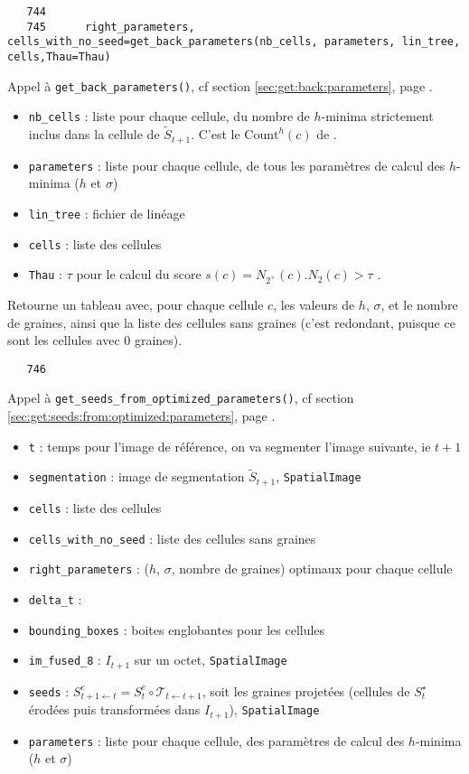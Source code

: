 \documentclass{article}
\def \mycolor {red}
\begin{document}
\color{black}
\begin{verbatim}  
   744	  
   745	    right_parameters, cells_with_no_seed=get_back_parameters(nb_cells, parameters, lin_tree, cells,Thau=Thau)
\end{verbatim} 
\color{\mycolor}
Appel \`a \texttt{get\_back\_parameters()}, cf section \ref{sec:get:back:parameters}, page \pageref{sec:get:back:parameters}.
\begin{itemize}
\itemsep -0.5ex
\item \verb|nb_cells| : liste pour chaque cellule, du nombre de $h$-minima strictement inclus dans la cellule de  $\tilde{S}_{t+1}$. C'est le $\mathrm{Count}^{h}(c)$ de \cite[section 2.3.3.5, page 71]{guignard:tel-01278725}.
\item \verb|parameters| : liste pour chaque cellule,  de tous les param\`etres de calcul des $h$-minima ($h$ et $\sigma$)
\item \verb|lin_tree| : fichier de lin\'eage
\item \verb|cells| : liste des cellules
\item \verb|Thau| : $\tau$ pour le calcul du score $s(c) = N_{2^{+}}(c) . N_2(c) > \tau$ \cite[page 72]{guignard:tel-01278725}.
\end{itemize}
Retourne un tableau avec, pour chaque cellule $c$, les valeurs de $h$, $\sigma$, et le nombre de graines, ainsi que la liste des cellules sans graines (c'est redondant, puisque ce sont les cellules avec 0 graines).
\color{black}
\begin{verbatim}
   746	    
\end{verbatim} 
\color{\mycolor}
Appel \`a \texttt{get\_seeds\_from\_optimized\_parameters()}, cf section \ref{sec:get:seeds:from:optimized:parameters}, page \pageref{sec:get:seeds:from:optimized:parameters}.
\begin{itemize}
\itemsep -0.5ex
\item \verb|t| : temps pour l'image de r\'ef\'erence, on va segmenter l'image suivante, ie $t+1$
\item \verb|segmentation| :  image de segmentation $\tilde{S}_{t+1}$, \texttt{SpatialImage}
\item \verb|cells| : liste des cellules
\item \verb|cells_with_no_seed| : liste des cellules sans graines
\item \verb|right_parameters| : ($h$, $\sigma$, nombre de graines) optimaux pour chaque cellule
\item \verb|delta_t| :
\item \verb|bounding_boxes| : boites englobantes pour les cellules
\item \verb|im_fused_8| : $I_{t+1}$ sur un octet, \texttt{SpatialImage}
\item \verb|seeds| : $S^e_{t+1 \leftarrow t} = S^e_t \circ \mathcal{T}_{t \leftarrow t+1}$, soit les graines projet\'ees (cellules de $S^{\star}_t$ \'erod\'ees puis transform\'ees dans $I_{t+1}$), \texttt{SpatialImage}
\item \verb|parameters| : liste pour chaque cellule,  des param\`etres de calcul des $h$-minima ($h$ et $\sigma$)
\end{itemize}
\end{document}
